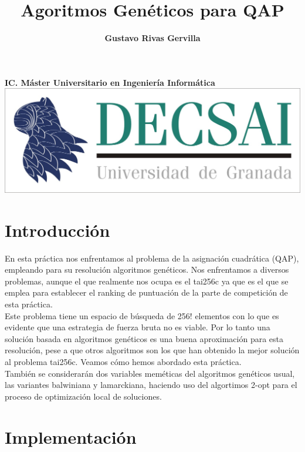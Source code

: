 \documentclass[10pt,a4paper]{article}
\author{\textbf{Gustavo Rivas Gervilla}}
\title{\textcolor{deepblue}{\textbf{Agoritmos Genéticos para QAP}}}
\date{}
\begin{document}
\maketitle
\begin{center}
\textbf{IC. Máster Universitario en Ingeniería Informática}
\newline
\newline
\newline
\includegraphics[scale=0.5]{img/decsai}
\end{center}

\newpage
\tableofcontents
\newpage

\def\layersep{2.5cm}

\section{Introducción}

En esta práctica nos enfrentamos al problema de la asignación cuadrática (QAP), empleando para su resolución algoritmos genéticos. Nos enfrentamos a diversos problemas, aunque el que realmente nos ocupa es el tai256c ya que es el que se emplea para establecer el ranking de puntuación de la parte de competición de esta práctica.\\

Este problema tiene un espacio de búsqueda de 256! elementos con lo que es evidente que una estrategia de fuerza bruta no es viable. Por lo tanto una solución basada en algoritmos genéticos es una buena aproximación para esta resolución, pese a que otros algoritmos son los que han obtenido la mejor solución al problema tai256c. Veamos cómo hemos abordado esta práctica.\\

También se considerarán dos variables meméticas del algoritmos genéticos usual, las variantes balwiniana y lamarckiana, haciendo uso del algortimos 2-opt para el proceso de optimización local de soluciones.

\section{Implementación}
\end{document}
